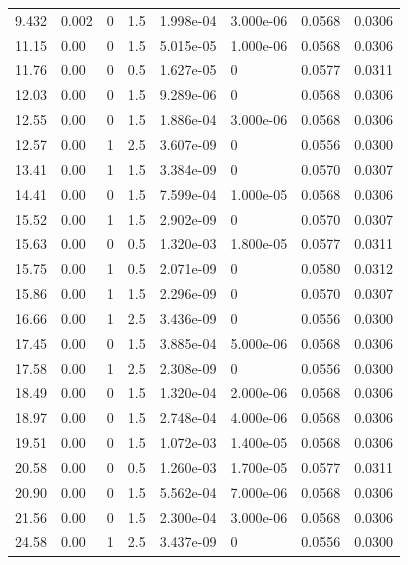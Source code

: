 \documentclass[preview]{standalone}
\begin{document}
{{\begin{tabular}{L{1.2cm}C{1.2cm} C{0.3cm}C{0.5cm} C{1.4cm}C{1.4cm} C{1.4cm}C{1.4cm}}
  9.432  &  0.002  & 0     & 1.5 &  1.998e-04  & 3.000e-06  & 0.0568 &  0.0306   \\ 
  11.15  &  0.00  & 0     & 1.5 &  5.015e-05  & 1.000e-06  & 0.0568 &  0.0306   \\ 
  11.76  &  0.00  & 0     & 0.5 &  1.627e-05  & 0  & 0.0577 &  0.0311   \\ 
  12.03  &  0.00  & 0     & 1.5 &  9.289e-06  & 0  & 0.0568 &  0.0306   \\ 
  12.55  &  0.00  & 0     & 1.5 &  1.886e-04  & 3.000e-06  & 0.0568 &  0.0306   \\ 
  12.57  &  0.00  & 1     & 2.5 &  3.607e-09  & 0  & 0.0556 &  0.0300   \\ 
  13.41  &  0.00  & 1     & 1.5 &  3.384e-09  & 0  & 0.0570 &  0.0307   \\ 
  14.41  &  0.00  & 0     & 1.5 &  7.599e-04  & 1.000e-05  & 0.0568 &  0.0306   \\ 
  15.52  &  0.00  & 1     & 1.5 &  2.902e-09  & 0  & 0.0570 &  0.0307   \\ 
  15.63  &  0.00  & 0     & 0.5 &  1.320e-03  & 1.800e-05  & 0.0577 &  0.0311   \\ 
  15.75  &  0.00  & 1     & 0.5 &  2.071e-09  & 0  & 0.0580 &  0.0312   \\ 
  15.86  &  0.00  & 1     & 1.5 &  2.296e-09  & 0  & 0.0570 &  0.0307   \\ 
  16.66  &  0.00  & 1     & 2.5 &  3.436e-09  & 0  & 0.0556 &  0.0300   \\ 
  17.45  &  0.00  & 0     & 1.5 &  3.885e-04  & 5.000e-06  & 0.0568 &  0.0306   \\ 
  17.58  &  0.00  & 1     & 2.5 &  2.308e-09  & 0  & 0.0556 &  0.0300   \\ 
  18.49  &  0.00  & 0     & 1.5 &  1.320e-04  & 2.000e-06  & 0.0568 &  0.0306   \\ 
  18.97  &  0.00  & 0     & 1.5 &  2.748e-04  & 4.000e-06  & 0.0568 &  0.0306   \\ 
  19.51  &  0.00  & 0     & 1.5 &  1.072e-03  & 1.400e-05  & 0.0568 &  0.0306   \\ 
  20.58  &  0.00  & 0     & 0.5 &  1.260e-03  & 1.700e-05  & 0.0577 &  0.0311   \\ 
  20.90  &  0.00  & 0     & 1.5 &  5.562e-04  & 7.000e-06  & 0.0568 &  0.0306   \\ 
  21.56  &  0.00  & 0     & 1.5 &  2.300e-04  & 3.000e-06  & 0.0568 &  0.0306   \\ 
  24.58  &  0.00  & 1     & 2.5 &  3.437e-09  & 0  & 0.0556 &  0.0300   \\ 

\end{tabular}}}
\end{document}
